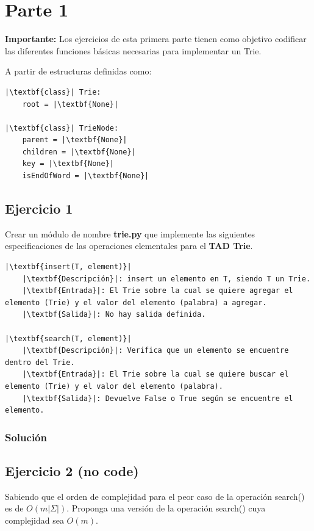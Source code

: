 \documentclass{article}
\begin{document}

\section*{Parte 1}

\textbf{Importante:} Los ejercicios de esta primera parte tienen como objetivo codificar las diferentes funciones básicas necesarias para implementar un Trie.

A partir de estructuras definidas como:

\begin{lstlisting}
|\textbf{class}| Trie:
    root = |\textbf{None}|

|\textbf{class}| TrieNode:
    parent = |\textbf{None}|
    children = |\textbf{None}|
    key = |\textbf{None}|
    isEndOfWord = |\textbf{None}|
\end{lstlisting}


\subsection*{Ejercicio 1}
Crear un módulo de nombre \textbf{trie.py} que implemente las siguientes especificaciones de las operaciones elementales para el \textbf{TAD Trie}.
\begin{lstlisting}
|\textbf{insert(T, element)}|
    |\textbf{Descripción}|: insert un elemento en T, siendo T un Trie.
    |\textbf{Entrada}|: El Trie sobre la cual se quiere agregar el elemento (Trie) y el valor del elemento (palabra) a agregar.
    |\textbf{Salida}|: No hay salida definida.

|\textbf{search(T, element)}|
    |\textbf{Descripción}|: Verifica que un elemento se encuentre dentro del Trie.
    |\textbf{Entrada}|: El Trie sobre la cual se quiere buscar el elemento (Trie) y el valor del elemento (palabra).
    |\textbf{Salida}|: Devuelve False o True según se encuentre el elemento.
\end{lstlisting}
\subsubsection*{Solución}


\subsection*{Ejercicio 2 (no code)}
Sabiendo que el orden de complejidad para el peor caso de la operación search() es de $O(m |\Sigma|)$. Proponga una versión de la operación search() cuya complejidad sea $O(m)$.
\end{document}
